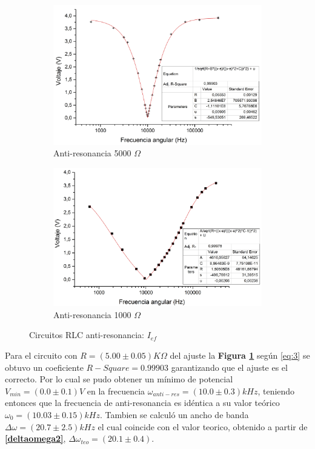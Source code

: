 \documentclass[11pt,a4paper]{article}
\begin{document}
\begin{figure}[h]

\begin{subfigure}{0.5\textwidth}
\includegraphics[scale=0.31]{RLC_ARES_5000_VvsF}
  \caption{Anti-resonancia 5000 $\Omega$}
  \label{subfig:ARES_I.a}
\end{subfigure}
\begin{subfigure}{0.5\textwidth}
\includegraphics[scale=0.3]{RLC_ARES_1000_VvsF}
  \caption{Anti-resonancia 1000 $\Omega$}
  \label{subfig:ARES_I.b}
\end{subfigure}
  \caption{Circuitos RLC anti-resonancia: $I_{ef}$}
  \label{fig:ARES_I}
\end{figure}

Para el circuito con $R=(5.00 \pm 0.05)K\Omega$ del ajuste la \textbf{Figura \ref{subfig:ARES_I.a}} según \eqref{eq:3} se obtuvo un coeficiente $R-Square = 0.99903$ garantizando que el ajuste es el correcto. Por lo cual se pudo obtener un mínimo de potencial $V_{min} = (0.0 \pm 0.1)V$ en la frecuencia $\omega_{anti-res} = (10.0 \pm 0.3) kHz$, teniendo entonces que la frecuencia de anti-resonancia es idéntica 
a su valor teórico $\omega_0 = (10.03 \pm 0.15) kHz$. Tambien se calculó un ancho de banda $\Delta\omega = (20.7 \pm 2.5) kHz$ el cual coincide con el valor teorico, obtenido a partir de \textbf{\eqref{deltaomega2}}, $\Delta\omega_{teo}=(20.1 \pm 0.4)$.
\end{document}
